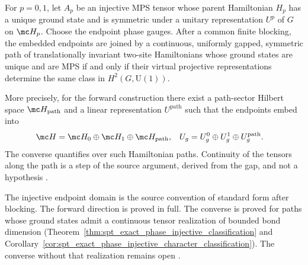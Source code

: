 \begin{theorem}
    \label{thm:spt_classification}
    \notready
    For $p=0,1$, let $A_p$ be an injective MPS tensor whose parent Hamiltonian
    $H_p$ has a unique ground state and is symmetric under a unitary
    representation $U^p$ of $G$ on $\mc H_p$. Choose the endpoint phase
    gauges. After a common finite blocking, the embedded endpoints are joined
    by a continuous, uniformly gapped, symmetric path of translationally
    invariant two-site Hamiltonians whose ground states are unique and are
    MPS if and only if their virtual projective representations determine
    the same class in $H^2(G,\mathrm U(1))$.

    More precisely, for the forward construction there exist a path-sector
    Hilbert space $\mc H_{\mathrm{path}}$ and a linear representation
    $U^{\mathrm{path}}$ such that the endpoints embed into
    \begin{align}
        \mc H & =\mc H_0\oplus\mc H_1\oplus\mc H_{\mathrm{path}}, &
        U_g   & =U_g^0\oplus U_g^1\oplus U_g^{\mathrm{path}}.
        \notag
    \end{align}
    The converse quantifies over such Hamiltonian paths. Continuity of the
    tensors along the path is a step of the source argument, derived from the
    gap, and not a hypothesis \cite[Section~II.F.2]{Schuch2011Phases}.

    The injective endpoint domain is the source convention of standard form
    after blocking. The forward direction is proved in full. The converse is
    proved for paths whose ground states admit a continuous tensor
    realization of bounded bond dimension
    (Theorem~\ref{thm:spt_exact_phase_injective_classification} and
    Corollary~\ref{cor:spt_exact_phase_injective_character_classification}).
    The converse without that realization remains open
    \cite{gap:spc11_spt_classification_continuous_realization}.
\end{theorem}

